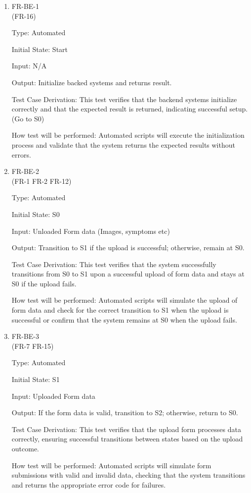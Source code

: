 \documentclass[12pt, titlepage]{article}
\begin{document}
\begin{enumerate}

\item{FR-BE-1\\} (FR-16)

Type: Automated 
					
Initial State: Start
					
Input: N/A
					
Output: Initialize backed systems and returns result.

Test Case Derivation: This test verifies that the backend systems initialize correctly and that the expected result  is returned, indicating successful setup. (Go to S0)

How test will be performed: Automated scripts will execute the initialization process and validate that the system returns the expected results without errors.

\item{FR-BE-2\\} (FR-1 FR-2 FR-12)

Type: Automated 
					
Initial State: S0
					
Input: Unloaded Form data (Images, symptoms etc)
					
Output: Transition to S1 if the upload is successful; otherwise, remain at S0.

Test Case Derivation: This test verifies that the system successfully transitions from S0 to S1 upon a successful upload of form data and stays at S0 if the upload fails.

How test will be performed: Automated scripts will simulate the upload of form data and check for the correct transition to S1 when the upload is successful or confirm that the system remains at S0 when the upload fails.

\item{FR-BE-3\\} (FR-7 FR-15)

Type: Automated 
					
Initial State: S1
					
Input: Uploaded Form data
					
Output: If the form data is valid, transition to S2; otherwise, return to S0.

Test Case Derivation: This test verifies that the upload form processes data correctly, ensuring successful transitions between states based on the upload outcome.

How test will be performed: Automated scripts will simulate form submissions with valid and invalid data, checking that the system transitions and returns the appropriate error code for failures.


\end{enumerate}
\end{document}
